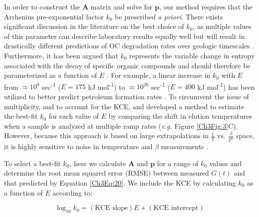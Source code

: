 In order to construct the $\mathbf{A}$ matrix and solve for $\mathbf{p}$, our method requires that the Arrhenius pre-exponential factor $k_{0}$ be prescribed \textit{a priori}. There exists significant discussion in the literature on the best choice of $k_{0}$, as multiple values of this parameter can describe laboratory results equally well but will result in drastically different predictions of OC degradation rates over geologic timescales \citep{Braun:1987vf,Burnham:1987ut,Lakshmanan:1991tr,Dieckmann:2005dw}. Furthermore, it has been argued that $k_{0}$ represents the variable change in entropy associated with the decay of specific organic compounds and should therefore be parameterized as a function of $E$ \citep[the so-called "kinetic compensation effect" or "KCE";][]{Tang:2000ua}. For example, a linear increase in $k_{0}$ with $E$ from $\approx 10^{8}$ sec\textsuperscript{-1} ($E = 175$ kJ mol\textsuperscript{-1}) to $\approx 10^{26}$ sec\textsuperscript{-1} ($E = 400$ kJ mol\textsuperscript{-1}) has been utilized to better predict petroleum formation rates \citep{Dieckmann:2005dw}. To circumvent the issue of multiplicity, and to account for the KCE, \citet{Miura:1995uo} and \citet{Miura:1998jf} developed a method to estimate the best-fit $k_{0}$ for each value of $E$ by comparing the shift in elution temperatures when a sample is analyzed at multiple ramp rates (\textit{e.g.} Figure \ref{Ch3Fig:3}C). However, because this approach is based on large extrapolations in $\frac{1}{T}$ vs. $\frac{\beta}{T^{2}}$ space, it is highly sensitive to noise in temperature and $\beta$ measurements \citep{Burnham:1989vm}.

To select a best-fit $k_{0}$, here we calculate $\mathbf{A}$ and $\mathbf{p}$ for a range of $k_{0}$ values and determine the root mean squared error (RMSE) between measured $G(t)$ and that predicted by Equation \ref{Ch3Eq:20}. We include the KCE by calculating $k_{0}$ as a function of $E$ according to:

\begin{equation}\label{Ch3Eq:21}
	\log_{10} k_{0} = (\text{KCE slope})E + (\text{KCE intercept})
\end{equation}

